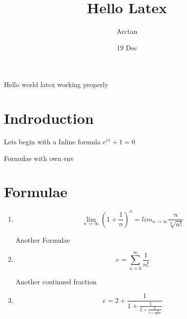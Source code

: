 \documentclass{article}
\title{Hello Latex}
\author{Arctan}
\date{19 Dec}
\begin{document}
    \maketitle
    Hello world  latex working properly
    \section{Indroduction}

    Lets begin with a Inline formula $e^{i\pi} + 1 =0$

Formulae with own env
    \section{Formulae}
    \begin{enumerate}
        
    
    A Formulae
   \item  $$ \lim_{n\to\infty} \left(1+\frac{1}{n}\right)^n = lim_{n\to\infty}\frac{n}{\sqrt[n]{n!}} $$

    Another Formulae
    \item $$e = \sum_{n=0}^{\infty}\frac{1}{n!}$$
    
    Another continued fraction

    \item $$e = 2+\frac{1}{1+\frac{1}{2+\frac{2}{3+\frac{3}{4+\ddots}}}}$$
\end{enumerate}
\end{document}

